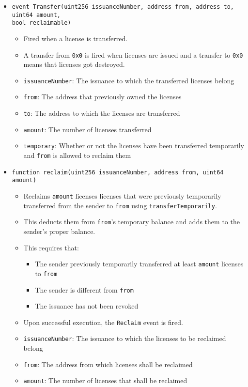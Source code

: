 \documentclass[a4paper]{article}
\begin{document}
\begin{itemize}
  \item \texttt{event Transfer(uint256 issuanceNumber, address from, address to, uint64 amount, \\bool reclaimable)}
  \begin{itemize}
    \item Fired when a license is transferred. 
    \item A transfer from \texttt{0x0} is fired when licenses are issued and a transfer to \texttt{0x0} means that licenses got destroyed.
    \item \texttt{issuanceNumber}: The issuance to which the transferred licenses belong
    \item \texttt{from}: The address that previously owned the licenses
    \item \texttt{to}: The address to which the licenses are transferred
    \item \texttt{amount}: The number of licenses transferred
    \item \texttt{temporary}: Whether or not the licenses have been transferred temporarily and \texttt{from} is allowed to reclaim them
  \end{itemize}
  
  \item \texttt{function reclaim(uint256 issuanceNumber, address from, uint64 amount)}
  \begin{itemize}
    \item Reclaims \texttt{amount} licenses licenses that were previously temporarily transferred from the sender to \texttt{from} using \texttt{transferTemporarily}. 
    \item This deducts them from \texttt{from}'s temporary balance and adds them to the sender's proper balance.
    \item This requires that:
    \begin{itemize}
      \item The sender previously temporarily transferred at least \texttt{amount} licenses to \texttt{from}
      \item The sender is different from \texttt{from}
      \item The issuance has not been revoked
    \end{itemize}
    \item Upon successful execution, the \texttt{Reclaim} event is fired.
    \item \texttt{issuanceNumber}: The issuance to which the licenses to be reclaimed belong
    \item \texttt{from}: The address from which licenses shall be reclaimed
    \item \texttt{amount}: The number of licenses that shall be reclaimed
  \end{itemize}
  

\end{itemize}
\end{document}
